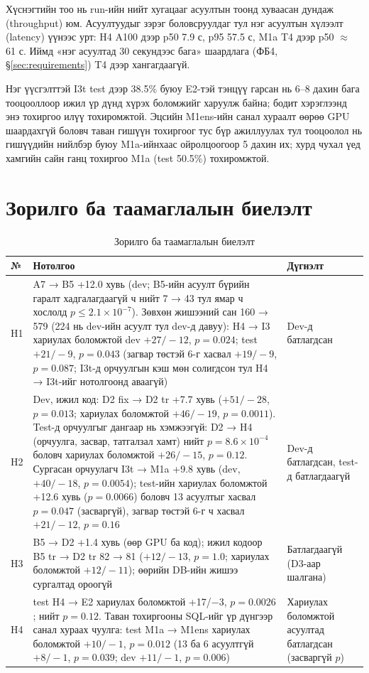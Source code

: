 Хүснэгтийн тоо нь run-ийн нийт хугацааг асуултын тоонд хуваасан дундаж (throughput) юм. Асуултуудыг зэрэг боловсруулдаг тул
нэг асуултын хүлээлт (latency) үүнээс урт: H4 A100 дээр p50 7.9 с, p95 57.5 с, M1a T4 дээр p50 $\approx$ 61 с. Иймд «нэг
асуултад 30 секундээс бага» шаардлага (ФБ4, §\ref{sec:requirements}) T4 дээр хангагдаагүй.

Нэг үүсгэлттэй I3t test дээр 38.5\% буюу E2-тэй тэнцүү гарсан нь 6--8 дахин бага тооцооллоор ижил үр дүнд хүрэх
боломжийг харуулж байна; бодит хэрэглээнд энэ тохиргоо илүү тохиромжтой. Эцсийн M1ens-ийн санал хураалт өөрөө GPU
шаардахгүй боловч таван гишүүн тохиргоог тус бүр ажиллуулах тул тооцоолол нь гишүүдийн нийлбэр буюу M1a-ийнхаас ойролцоогоор
5 дахин их; хурд чухал үед хамгийн сайн ганц тохиргоо M1a (test 50.5\%) тохиромжтой.

\section{Зорилго ба таамаглалын биелэлт}
\label{sec:hyp-check}

\begin{table}[H]
\centering\small
\caption{Зорилго ба таамаглалын биелэлт}
\label{tab:hyp-check}
\begin{tabularx}{\textwidth}{p{1.0cm}X p{2.4cm}}
\toprule
№ & Нотолгоо & Дүгнэлт \\
\midrule
H1 & A7 → B5 +12.0 хувь (dev; B5-ийн асуулт бүрийн гаралт хадгалагдаагүй ч нийт 7 → 43 тул ямар ч хослолд $p \leq 2.1\times10^{-7}$). Зөвхөн жишээний сан 160 → 579 (224 нь dev-ийн асуулт тул dev-д давуу): H4 → I3 хариулах боломжтой dev $+27/-12$, $p = 0.024$; test $+21/-9$, $p = 0.043$ (загвар төстэй 6-г хасвал $+19/-9$, $p = 0.087$; I3t-д орчуулгын кэш мөн солигдсон тул H4 → I3t-ийг нотолгоонд аваагүй) & Dev-д батлагдсан \\
H2 & Dev, ижил код: D2 fix → D2 tr +7.7 хувь ($+51/-28$, $p = 0.013$; хариулах боломжтой $+46/-19$, $p = 0.0011$). Test-д орчуулгыг дангаар нь хэмжээгүй: D2 → H4 (орчуулга, засвар, татгалзал хамт) нийт $p = 8.6\times10^{-4}$ боловч хариулах боломжтой $+26/-15$, $p = 0.12$. Сургасан орчуулагч I3t → M1a +9.8 хувь (dev, $+40/-18$, $p = 0.0054$); test-ийн хариулах боломжтой +12.6 хувь ($p = 0.0066$) боловч 13 асуултыг хасвал $p = 0.047$ (засваргүй), загвар төстэй 6-г ч хасвал $+21/-12$, $p = 0.16$ & Dev-д батлагдсан, test-д батлагдаагүй \\
H3 & B5 → D2 +1.4 хувь (өөр GPU ба код); ижил кодоор B5 tr → D2 tr 82 → 81 ($+12/-13$, $p = 1.0$; хариулах боломжтой $+12/-11$); өөрийн DB-ийн жишээ сургалтад ороогүй & Батлагдаагүй (D3-аар шалгана) \\
H4 & test H4 → E2 хариулах боломжтой +17/−3, $p = 0.0026$; нийт $p = 0.12$. Таван тохиргооны SQL-ийг үр дүнгээр санал хураах чуулга: test M1a → M1ens хариулах боломжтой $+10/-1$, $p = 0.012$ (13 ба 6 асуултгүй $+8/-1$, $p = 0.039$; dev $+11/-1$, $p = 0.006$) & Хариулах боломжтой асуултад батлагдсан (засваргүй $p$) \\
\bottomrule
\end{tabularx}
\end{table}

